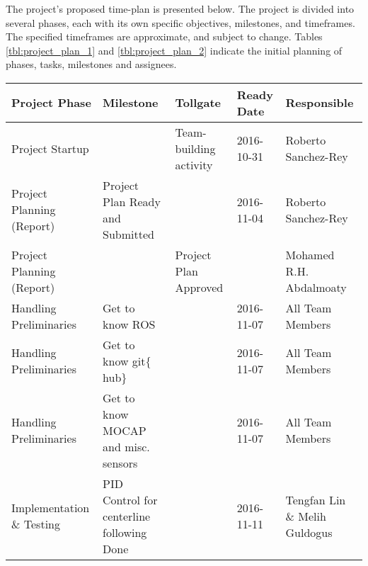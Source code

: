 \label{04}

The project's proposed time-plan is presented below. The
project is divided into several phases, each with its own specific objectives,
milestones, and timeframes. The specified timeframes are approximate, and
subject to change. Tables \ref{tbl:project_plan_1} and \ref{tbl:project_plan_2}
indicate the initial planning of phases, tasks, milestones and assignees.

\begin{landscape}
\begin{table}
  \begin{tabularx}{\linewidth}{l|X|X|X|X}
    Project Phase                   & Milestone                                           & Tollgate                                      & Ready Date & Responsible                                              \\ \hline
    Project Startup                 & ~                                                   & Team-building activity                        & 2016-10-31 & Roberto Sanchez-Rey                                      \\
    Project Planning (Report)       & Project Plan Ready and Submitted                    & ~                                             & 2016-11-04 & Roberto Sanchez-Rey                                      \\
    Project Planning (Report)       & ~                                                   & Project Plan Approved                         & ~          & Mohamed R.H. Abdalmoaty                                  \\ \hline
    Handling Preliminaries          & Get to know ROS                                     & ~                                             & 2016-11-07 & All Team Members                                         \\
    Handling Preliminaries          & Get to know git$\{$hub$\}$                          & ~                                             & 2016-11-07 & All Team Members                                         \\
    Handling Preliminaries          & Get to know MOCAP and misc. sensors                 & ~                                             & 2016-11-07 & All Team Members                                         \\ \hline
    Implementation \& Testing       & PID Control for centerline following Done           & ~                                             & 2016-11-11 & Tengfan Lin \& Melih Guldogus                            \\

\end{tabularx}
\end{table}
\end{landscape}
